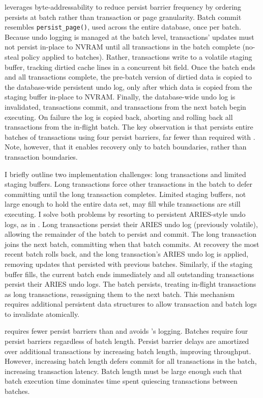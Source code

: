 \GroupCommit leverages byte-addressability to reduce persist barrier frequen\-cy by ordering persists at batch rather than transaction or page granularity.
Batch commit resembles \texttt{persist\_page()}, used across the entire data\-base, once per batch.
Because undo logging is managed at the batch level, transactions' updates must not persist in-place to NVRAM until all transactions in the batch complete (no-steal policy applied to batches).
Rather, transactions write to a volatile staging buffer, tracking dirtied cache lines in a concurrent bit field.
Once the batch ends and all transactions complete, the pre-batch version of dirtied data is copied to the database-wide persistent undo log, only after which data is copied from the staging buffer in-place to NVRAM.
Finally, the database-wide undo log is invalidated, transactions commit, and transactions from the next batch begin executing.
On failure the log is copied back, aborting and rolling back all transactions from the in-flight batch.
The key observation is that \GroupCommit persists entire batches of transactions using four persist barriers, far fewer than required with \InPlace.
Note, however, that it enables recovery only to batch boundaries, rather than transaction boundaries.

I briefly outline two implementation challenges: long transactions and limited staging buffers.
Long transactions force other transactions in the batch to defer committing until the long transaction completes.
Limited staging buffers, not large enough to hold the entire data set, may fill while transactions are still executing.
I solve both problems by resorting to persistent ARIES-style undo logs, as in \InPlace.
Long transactions persist their ARIES undo log (previously volatile), allowing the remainder of the batch to persist and commit.
The long transaction joins the next batch, committing when that batch commits.
At recovery the most recent batch rolls back, and the long transaction's ARIES undo log is applied, removing updates that persisted with previous batches.
Similarly, if the staging buffer fills, the current batch ends immediately and all outstanding transactions persist their ARIES undo logs.
The batch persists, treating in-flight transactions as long transactions, reassigning them to the next batch.
This mechanism requires additional persistent data structures to allow transaction and batch logs to invalidate atomically.

\GroupCommit requires fewer persist barriers than \InPlace and avoids \NVDisk's logging.
Batches require four persist barriers regardless of batch length.
Persist barrier delays are amortized over additional transactions by increasing batch length, improving throughput.
However, increasing batch length defers commit for all transactions in the batch, increasing transaction latency.
Batch length must be large enough such that batch execution time dominates time spent quiescing transactions between batches.


